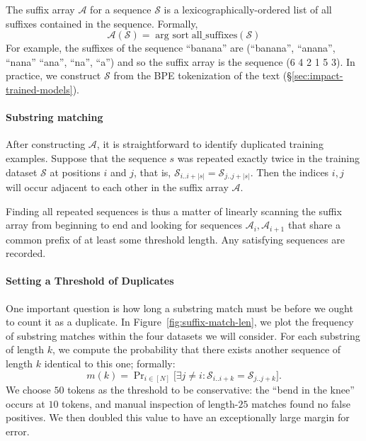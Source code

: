 The suffix array $\mathcal{A}$ for a sequence $\mathcal{S}$ is a lexicographically-ordered list of all suffixes contained in the sequence. 
%
Formally,
\[ \mathcal{A}(\mathcal{S}) = \mathop{\text{arg sort}} \text{all\_suffixes}(\mathcal{S}) \]
%
For example, the suffixes of the sequence ``banana'' are (``banana'',  ``anana'', ``nana'' ``ana'', ``na'', ``a'')
and so the suffix array is the sequence (6 4 2 1 5 3).
In practice, we construct $\mathcal{S}$ from the BPE tokenization of the text (\S\ref{sec:impact-trained-models}).




\paragraph{Substring matching}

After constructing $\mathcal{A}$, it is straightforward to identify duplicated training examples.
Suppose that the sequence $s$ was repeated exactly twice in the training dataset $\mathcal{S}$ at positions $i$ and $j$,
that is, $\mathcal{S}_{i..i+|s|} = \mathcal{S}_{j..j+|s|}$.
%
Then the indices $i, j$ will occur adjacent to each other in the suffix array $\mathcal{A}$.

Finding all repeated sequences is thus a matter of linearly scanning the suffix array from
beginning to end and looking for sequences $\mathcal{A}_i, \mathcal{A}_{i+1}$ that share a common prefix of
at least some threshold length.
%
Any satisfying sequences are recorded.
%

\paragraph{Setting a Threshold of Duplicates}
\label{section:exact_thresh}
One important question is how long a substring match must be before we ought to count it as a duplicate.
%
In Figure~\ref{fig:suffix-match-len}, we plot the frequency of substring matches within the four datasets we will
consider.
For each substring of length $k$, we compute the probability that there exists another sequence of length $k$ identical to this one; formally:
\[m(k) = \mathop{\text{Pr}}_{i \in [N]}\big[ \exists j \ne i : \mathcal{S}_{i..i+k} = \mathcal{S}_{j..j+k}\big].\]
We choose $50$ tokens as the threshold to be conservative:
the ``bend in the knee'' occurs at $10$ tokens, and manual inspection of
length-$25$ matches found no false positives.
We then doubled this value to have an exceptionally large margin for error.

